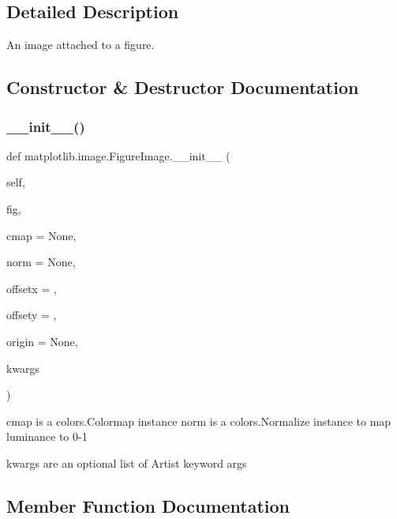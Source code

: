 \subsection{Detailed Description}
\begin{DoxyVerb}An image attached to a figure.\end{DoxyVerb}
 

\subsection{Constructor \& Destructor Documentation}
\mbox{\label{classmatplotlib_1_1image_1_1FigureImage_ac9ae5240d06aa46f87c2f2370b01f5d0}} 
\subsubsection{\texorpdfstring{\+\_\+\+\_\+init\+\_\+\+\_\+()}{\_\_init\_\_()}}
{\footnotesize\ttfamily def matplotlib.\+image.\+Figure\+Image.\+\_\+\+\_\+init\+\_\+\+\_\+ (\begin{DoxyParamCaption}\item[{}]{self,  }\item[{}]{fig,  }\item[{}]{cmap = {\ttfamily None},  }\item[{}]{norm = {\ttfamily None},  }\item[{}]{offsetx = {},  }\item[{}]{offsety = {},  }\item[{}]{origin = {\ttfamily None},  }\item[{}]{kwargs }\end{DoxyParamCaption})}

\begin{DoxyVerb}cmap is a colors.Colormap instance
norm is a colors.Normalize instance to map luminance to 0-1

kwargs are an optional list of Artist keyword args
\end{DoxyVerb}
 

\subsection{Member Function Documentation}
\mbox{\label{classmatplotlib_1_1image_1_1FigureImage_a1b0fcc58368310d727f3bb55ba9c1ad3}} 
